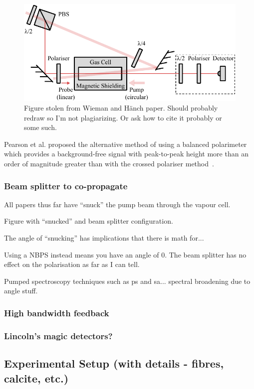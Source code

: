 \begin{figure}
\center
\includegraphics{part1/Figs/PolSpecWieman.pdf}
\caption{Figure stolen from Wieman and H\"anch paper.
Should probably redraw so I'm not plagiarizing.
Or ask how to cite it probably or some such.}
\label{figure:wieman_doppler-free_schematic}
\end{figure}

Pearson et al. proposed the alternative method of using a balanced polarimeter which provides a background-free signal with peak-to-peak height more than an order of magnitude greater than with the crossed polariser method~\cite{pearman_polarization_2002}.

\subsubsection{Beam splitter to co-propagate}

All papers thus far have ``snuck'' the pump beam through the vapour cell.

Figure with ``snucked'' and beam splitter configuration.

The angle of ``snucking'' has implications that there is math for...

Using a NBPS instead means you have an angle of 0.
The beam splitter has no effect on the polarisation as far as I can tell.

Pumped spectroscopy techniques such as \gls{ps} and \gls{sa}... spectral broadening due to angle stuff.

\subsubsection{High bandwidth feedback}


\subsubsection{Lincoln's magic detectors?}

\subsection{Experimental Setup (with details - fibres, calcite, etc.)}

